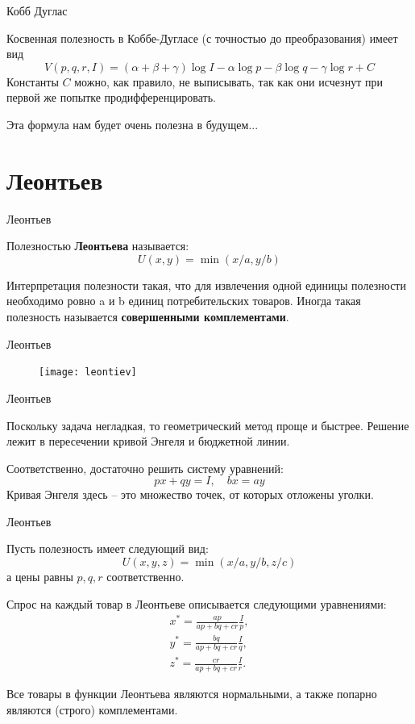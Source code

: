 \documentclass{beamer}
\begin{document}
\begin{frame}{Кобб Дуглас}

Косвенная полезность в Коббе-Дугласе (с точностью до преобразования) имеет вид
$$V(p,q,r,I) = (\alpha + \beta + \gamma) \log I - \alpha \log p - \beta \log q - \gamma \log r + C $$
Константы $C$ можно, как правило, не выписывать, так как они исчезнут при первой же попытке продифференцировать.

Эта формула нам будет очень полезна в будущем...
\end{frame}

\section{Леонтьев}

\begin{frame}{Леонтьев}

\begin{definition}
Полезностью \textbf{Леонтьева} называется:
$$U(x, y) = \min(x/a, y/b)$$  
\end{definition}

Интерпретация полезности такая, что для извлечения одной единицы полезности необходимо ровно a и b единиц потребительских товаров. Иногда такая полезность называется \textbf{совершенными комплементами}.

\end{frame}

\begin{frame}{Леонтьев}

\begin{figure}[hbt]
\centering
\texttt{[image: leontiev]}
\end{figure}

\end{frame}

\begin{frame}{Леонтьев}

Поскольку задача негладкая, то геометрический метод проще и быстрее. Решение лежит в пересечении кривой Энгеля и бюджетной линии. 

Соответственно, достаточно решить систему уравнений:
$$ px + qy = I, \quad b x = a y$$
Кривая Энгеля здесь – это множество точек, от которых отложены уголки.

\end{frame}

\begin{frame}{Леонтьев}

Пусть полезность имеет следующий вид:
$$U(x,y,z) = \min(x/a, y/b, z/c)$$ 
а цены равны $p, q, r$ соответственно. 

Спрос на каждый товар в Леонтьеве описывается следующими уравнениями:
\begin{gather*}
x^{\ast} = \frac{ap}{ap + bq + cr} \frac{I}{p}, \\
y^{\ast} = \frac{bq}{ap + bq + cr} \frac{I}{q}, \\
z^{\ast} = \frac{cr}{ap + bq + cr} \frac{I}{r}.
\end{gather*}

Все товары в функции Леонтьева являются нормальными, а также попарно являются (строго) комплементами.

\end{frame}
\end{document}
